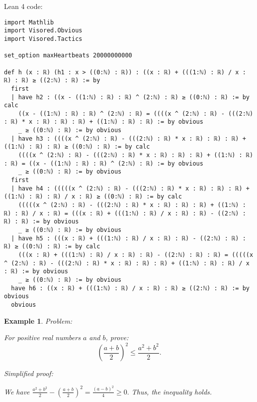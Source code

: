 \documentclass{article}
\newtheorem{example}{Example}
\begin{document}
Lean 4 code:
\begin{tcolorbox}[colback=white!10, width=\linewidth]
\begin{lstlisting}[language=Lean4]
import Mathlib
import Visored.Obvious
import Visored.Tactics

set_option maxHeartbeats 20000000000

def h (x : ℝ) (h1 : x > ((0:ℕ) : ℝ)) : ((x : ℝ) + (((1:ℕ) : ℝ) / x : ℝ) : ℝ) ≥ ((2:ℕ) : ℝ) := by
  first
  | have h2 : ((x - ((1:ℕ) : ℝ) : ℝ) ^ (2:ℕ) : ℝ) ≥ ((0:ℕ) : ℝ) := by calc
    ((x - ((1:ℕ) : ℝ) : ℝ) ^ (2:ℕ) : ℝ) = ((((x ^ (2:ℕ) : ℝ) - (((2:ℕ) : ℝ) * x : ℝ) : ℝ) : ℝ) + ((1:ℕ) : ℝ) : ℝ) := by obvious
    _ ≥ ((0:ℕ) : ℝ) := by obvious
  | have h3 : ((((x ^ (2:ℕ) : ℝ) - (((2:ℕ) : ℝ) * x : ℝ) : ℝ) : ℝ) + ((1:ℕ) : ℝ) : ℝ) ≥ ((0:ℕ) : ℝ) := by calc
    ((((x ^ (2:ℕ) : ℝ) - (((2:ℕ) : ℝ) * x : ℝ) : ℝ) : ℝ) + ((1:ℕ) : ℝ) : ℝ) = ((x - ((1:ℕ) : ℝ) : ℝ) ^ (2:ℕ) : ℝ) := by obvious
    _ ≥ ((0:ℕ) : ℝ) := by obvious
  first
  | have h4 : (((((x ^ (2:ℕ) : ℝ) - (((2:ℕ) : ℝ) * x : ℝ) : ℝ) : ℝ) + ((1:ℕ) : ℝ) : ℝ) / x : ℝ) ≥ ((0:ℕ) : ℝ) := by calc
    (((((x ^ (2:ℕ) : ℝ) - (((2:ℕ) : ℝ) * x : ℝ) : ℝ) : ℝ) + ((1:ℕ) : ℝ) : ℝ) / x : ℝ) = (((x : ℝ) + (((1:ℕ) : ℝ) / x : ℝ) : ℝ) - ((2:ℕ) : ℝ) : ℝ) := by obvious
    _ ≥ ((0:ℕ) : ℝ) := by obvious
  | have h5 : (((x : ℝ) + (((1:ℕ) : ℝ) / x : ℝ) : ℝ) - ((2:ℕ) : ℝ) : ℝ) ≥ ((0:ℕ) : ℝ) := by calc
    (((x : ℝ) + (((1:ℕ) : ℝ) / x : ℝ) : ℝ) - ((2:ℕ) : ℝ) : ℝ) = (((((x ^ (2:ℕ) : ℝ) - (((2:ℕ) : ℝ) * x : ℝ) : ℝ) : ℝ) + ((1:ℕ) : ℝ) : ℝ) / x : ℝ) := by obvious
    _ ≥ ((0:ℕ) : ℝ) := by obvious
  have h6 : ((x : ℝ) + (((1:ℕ) : ℝ) / x : ℝ) : ℝ) ≥ ((2:ℕ) : ℝ) := by obvious
  obvious

\end{lstlisting}
\end{tcolorbox}


\begin{example}
Problem:
\begin{tcolorbox}[colback=yellow!10, width=\linewidth]
For positive real numbers $a$ and $b$, prove:
    $$\left(\frac{a+b}{2}\right)^2 \leq \frac{a^2+b^2}{2}.$$
\end{tcolorbox}

Simplified proof:
\begin{tcolorbox}[colback=blue!10, width=\linewidth]
We have
$ \frac{a^2+b^2}{2} - \left(\frac{a+b}{2}\right)^2 = \frac{(a-b)^2}{4} \ge 0. $
Thus, the inequality holds.
\end{tcolorbox}
\end{example}
\end{document}

